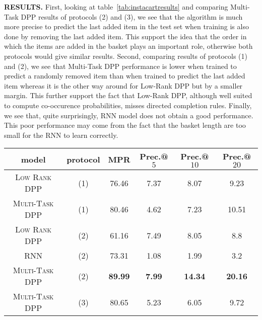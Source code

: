 \noindent
\textbf{RESULTS.}
First, looking at table~\ref{tab:instacartresults} and comparing Multi-Task DPP results of protocols (2) and (3), we see that the algorithm is much more precise to predict the last added item in the test set when training is also done by removing the last added item. This support the idea that the order in which the items are added in the basket plays an important role, otherwise both protocols would give similar results. Second, comparing results of protocols (1) and (2), we see that Multi-Task DPP performance is lower when trained to predict a randomly removed item than when trained to predict the last added item whereas it is the other way around for Low-Rank DPP but by a smaller margin. This further support the fact that Low-Rank DPP, although well suited to compute co-occurence probabilities, misses directed completion rules. Finally, we see that, quite surprisingly, RNN model does not obtain a good performance. This poor performance may come from the fact that the basket length are too small for the RNN to learn correctly. 

\begin{table*}
\begin{center}
\begin{tabular}{cccccc}
\hline
model & protocol & MPR & Prec.@$5$ & Prec.@$10$ & Prec.@$20$ \\ 
\hline
\textsc{Low Rank DPP} & (1) & 76.46 & 7.37 & 8.07 & 9.23 \\
\textsc{Multi-Task DPP} & (1) & 80.46 & 4.62 & 7.23 & 10.51 \\
\hline
\textsc{Low Rank DPP} & (2) & 61.16 & 7.49 & 8.05 & 8.8 \\
\textsc{RNN} & (2) & 73.31 & 1.08 & 1.99 & 3.2 \\
\textsc{Multi-Task DPP} & (2) & \textbf{89.99} & \textbf{7.99} & \textbf{14.34} & \textbf{20.16} \\
\hline
\textsc{Multi-Task DPP} & (3) & 80.65 & 5.23 & 6.05 & 9.72
\end{tabular}
\caption{Performance of the models on Instacart dataset. All models used $80$ latent factors.}
\label{tab:instacartresults}
\end{center}
\end{table*}
